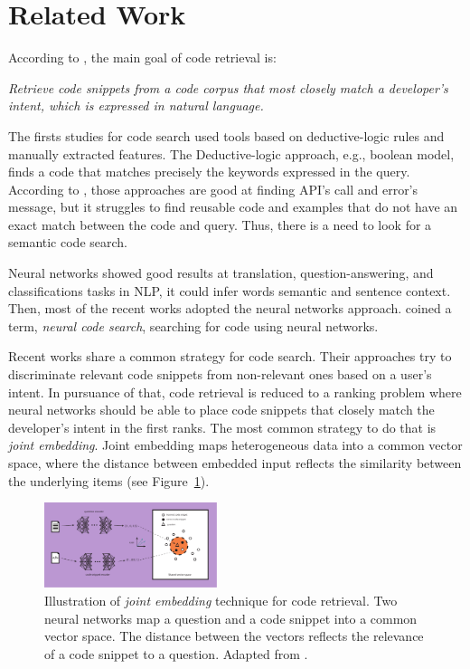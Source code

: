 \documentclass[sigconf]{acmart}
\begin{document}
\section{Related Work}

According to \cite{cambronero-deep-code-search-2019}, the main goal of code retrieval is:

\emph{Retrieve code snippets from a code corpus that most closely match a developer's intent, which is expressed in natural language.}

The firsts studies for code search used tools based on deductive-logic rules and manually extracted features. The Deductive-logic approach, e.g., boolean model, finds a code that matches precisely the keywords expressed in the query. According to \cite{yan-benchmark-code-search-information-retrieval-deep-learning:2020}, those approaches are good at finding API's call and error's message, but it struggles to find reusable code and examples that do not have an exact match between the code and query. Thus, there is a need to look for a semantic code search.

Neural networks showed good results at translation, question-answering, and classifications tasks in NLP, it could infer words semantic and sentence context. Then, most of the recent works adopted the neural networks approach. \citet{cambronero-deep-code-search-2019} coined a term, \emph{neural code search}, searching for code using neural networks.

Recent works share a common strategy for code search. Their approaches try to discriminate relevant code snippets from non-relevant ones based on a user's intent. In pursuance of that, code retrieval is reduced to a ranking problem where neural networks should be able to place code snippets that closely match the developer's intent in the first ranks. The most common strategy to do that is \emph{joint embedding}. Joint embedding maps heterogeneous data into a common vector space, where the distance between embedded input reflects the similarity between the underlying items \cite{li-joint-embedding-images-2015} (see Figure~\ref{fig:joint-embedding}).

\begin{figure}[H]
  \includegraphics[width=0.45\textwidth]{figuras/joint_embedding-article.pdf}
  \caption{Illustration of \emph{joint embedding} technique for code retrieval. Two neural networks map a question and a code snippet into a common vector space. The distance between the vectors reflects the relevance of a code snippet to a question. Adapted from \cite{cambronero-deep-code-search-2019}.}
  \label{fig:joint-embedding}
\end{figure}
\end{document}

